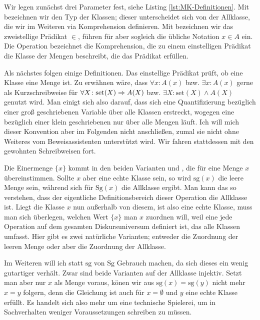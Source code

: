 Wir legen zunächst drei Parameter fest, siehe Listing
\ref{lst:MK-Definitionen}. Mit  bezeichnen wir den Typ der
Klassen; dieser unterscheidet sich von der Allklasse, die
wir im Weiteren via Komprehension definieren. Mit  bezeichnen
wir das zweistellige Prädikat $\in$, führen für  aber sogleich
die übliche Notation $x\in A$ ein. Die Operation  bezeichnet
die Komprehension, die zu einem einstelligen Prädikat die Klasse der
Mengen beschreibt, die das Prädikat erfüllen.

Als nächstes folgen einige Definitionen. Das einstellige Prädikat
 prüft, ob eine Klasse eine Menge ist. Zu erwähnen wäre,
dass $\forall x\colon A(x)$ bzw. $\exists x\colon A(x)$ gerne als
Kurzschreibweise für $\forall X\colon\mathrm{set}(X)\Rightarrow A(X)$ bzw.
$\exists X\colon\mathrm{set}(X)\land A(X)$ genutzt wird. Man einigt
sich also darauf, dass sich eine Quantifizierung bezüglich einer groß
geschriebenen Variable über alle Klassen erstreckt, wogegen eine bezüglich
einer klein geschriebenen nur über alle Mengen läuft. Ich will mich dieser
Konvention aber im Folgenden nicht anschließen, zumal sie nicht ohne
Weiteres vom Beweisassistenten unterstützt wird. Wir fahren stattdessen
mit den gewohnten Schreibweisen fort.

Die Einermenge $\{x\}$ kommt in den beiden Varianten  und
, die für eine Menge $x$ übereinstimmen. Sollte $x$ aber eine
echte Klasse sein, so wird $\mathrm{sg}(x)$ die leere Menge sein, während sich
für $\mathrm{Sg}(x)$ die Allklasse ergibt. Man kann das so verstehen, dass der
eigentliche Definitionsbereich dieser Operation die Allklasse ist. Liegt
die Klasse $x$ nun außerhalb von diesem, ist also eine echte Klasse, muss
man sich überlegen, welchen Wert $\{x\}$ man $x$ zuordnen will, weil eine
jede Operation auf dem gesamten Diskursuniversum definiert ist, das alle
Klassen umfasst. Hier gibt es zwei natürliche Varianten; entweder die
Zuordnung der leeren Menge oder aber die Zuordnung der Allklasse.

Im Weiteren will ich statt $\mathrm{sg}$ von $\mathrm{Sg}$ Gebrauch machen,
da sich dieses ein wenig gutartiger verhält. Zwar sind beide Varianten
auf der Allklasse injektiv. Setzt man aber nur $x$ als Menge voraus,
könen wir aus $\mathrm{sg}(x)=\mathrm{sg}(y)$ nicht mehr $x=y$ folgern,
denn die Gleichung ist auch für $x=\emptyset$ und $y$ eine echte Klasse
erfüllt. Es handelt sich also mehr um eine technische Spielerei, um in
Sachverhalten weniger Voraussetzungen schreiben zu müssen.

